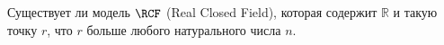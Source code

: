 Существует ли модель $\RCF$ (Real Closed Field), которая содержит $\mathbb{R}$ и такую точку $r$, что $r$
больше любого натурального числа $n$.
